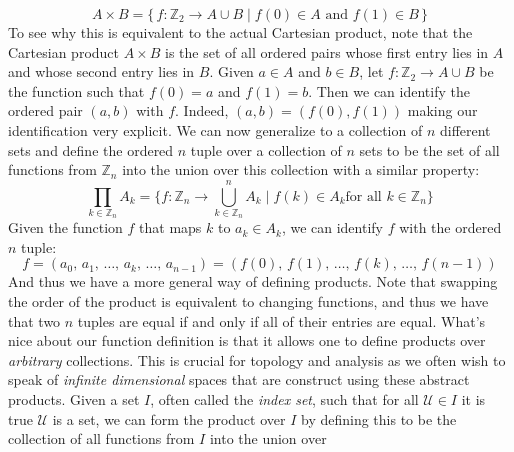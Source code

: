         \begin{equation}
            A\times{B}=
            \big\{\,f:\mathbb{Z}_{2}\rightarrow{A}\cup{B}\;|\;
                f(0)\in{A}\textrm{ and }f(1)\in{B}\,\big\}
        \end{equation}
        To see why this is equivalent to the actual Cartesian product, note that
        the Cartesian product $A\times{B}$ is the set of all ordered pairs whose
        first entry lies in $A$ and whose second entry lies in $B$. Given
        $a\in{A}$ and $b\in{B}$, let $f:\mathbb{Z}_{2}\rightarrow{A}\cup{B}$ be
        the function such that $f(0)=a$ and $f(1)=b$. Then we can identify the
        ordered pair $(a,b)$ with $f$. Indeed, $(a,b)=(f(0),f(1))$ making our
        identification very explicit. We can now generalize to a collection of
        $n$ different sets and define the ordered $n$ tuple over a collection of
        $n$ sets to be the set of all functions from $\mathbb{Z}_{n}$ into the
        union over this collection with a similar property:
        \begin{equation}
            \prod_{k\in\mathbb{Z}_{n}}A_{k}
            =\big\{f:\mathbb{Z}_{n}\rightarrow\bigcup_{k\in\mathbb{Z}_{n}}^{n}
                A_{k}\;|\;f(k)\in{A}_{k}
                \textrm{for all }k\in\mathbb{Z}_{n}\big\}
        \end{equation}
        Given the function $f$ that maps $k$ to $a_{k}\in{A}_{k}$, we can
        identify $f$ with the ordered $n$ tuple:
        \begin{equation}
            f=(a_{0},\,a_{1},\,\dots,\,a_{k},\,\dots,\,a_{n-1})
            =(f(0),\,f(1),\,\dots,\,f(k),\,\dots,\,f(n-1))
        \end{equation}
        And thus we have a more general way of defining products. Note that
        swapping the order of the product is equivalent to changing functions,
        and thus we have that two $n$ tuples are equal if and only if all of
        their entries are equal. What's nice about our function definition is
        that it allows one to define products over \textit{arbitrary}
        collections. This is crucial for topology and analysis as we often wish
        to speak of \textit{infinite dimensional} spaces that are construct
        using these abstract products. Given a set $I$, often called the
        \textit{index set}, such that for all $\mathcal{U}\in{I}$ it is true
        $\mathcal{U}$ is a set, we can form the product over $I$ by defining
        this to be the collection of all functions from $I$ into the union over

